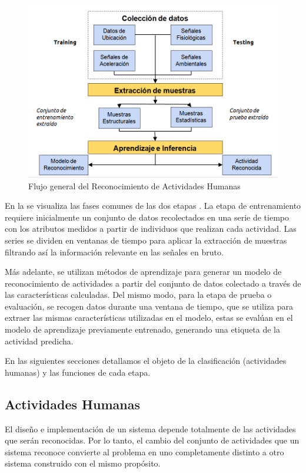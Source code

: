 \begin{figure}[!htbp]
\centering \includegraphics[width=0.7\linewidth]{capitulo-2/graphics/harsystem}
\caption[Flujo HAR]{Flujo general del Reconocimiento de Actividades Humanas}
\label{fig:harsystem} 
\end{figure}

En la  se visualiza las fases comunes de las
dos etapas \cite{LaraLabrador2013}. La etapa de entrenamiento requiere
inicialmente un conjunto de datos recolectados en una serie de tiempo
con los atributos medidos a partir de individuos que realizan cada
actividad. Las series se dividen en ventanas de tiempo para aplicar
la extracción de muestras filtrando así la información relevante en
las señales en bruto. 

Más adelante, se utilizan métodos de aprendizaje para generar un modelo
de reconocimiento de actividades a partir del conjunto de datos colectado
a través de las características calculadas. Del mismo modo, para la
etapa de prueba o evaluación, se recogen datos durante una ventana
de tiempo, que se utiliza para extraer las mismas características
utilizadas en el modelo, estas se evalúan en el modelo de aprendizaje
previamente entrenado, generando una etiqueta de la actividad predicha.

En las siguientes secciones detallamos el objeto de la clasificación
(actividades humanas) y las funciones de cada etapa.

\subsection{Actividades Humanas}

\label{sec263:actividades-humanas} El diseño e implementación de
un sistema  depende totalmente de las actividades que serán
reconocidas. Por lo tanto, el cambio del conjunto de actividades que
un sistema reconoce convierte al problema en uno completamente distinto
a otro sistema construido con el mismo propósito.

